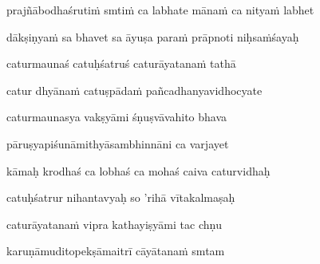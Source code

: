 \nemslokac 
prajñābodhaśruti\.m smti\.m ca labhate māna\.m ca nitya\.m labhet
\dontdisplaylinenum

\nemslokad 
dākṣiṇya\.m sa bhavet sa āyuṣa para\.m prāpnoti niḥsa\.mśayaḥ \veg\dontdisplaylinenum


\vers

caturmaunaś catuḥśatruś caturāyatana\.m tathā\thinspace{\dandab} \dontdisplaylinenum

catur dhyāna\.m catuṣpāda\.m pañcadhanyavidhocyate \veg\dontdisplaylinenum

caturmaunasya vakṣyāmi śṇuṣvāvahito bhava\thinspace{\dandab} \dontdisplaylinenum

pāruṣyapiśunāmithyāsambhinnāni ca varjayet \veg\dontdisplaylinenum

kāmaḥ krodhaś ca lobhaś ca mohaś caiva caturvidhaḥ\thinspace{\dandab} \dontdisplaylinenum 

catuḥśatrur nihantavyaḥ so 'rihā vītakalmaṣaḥ \veg\dontdisplaylinenum

caturāyatana\.m vipra kathayiṣyāmi tac chṇu\thinspace{\dandab} \dontdisplaylinenum

karuṇāmuditopekṣāmaitrī cāyātana\.m smtam \veg\dontdisplaylinenum

